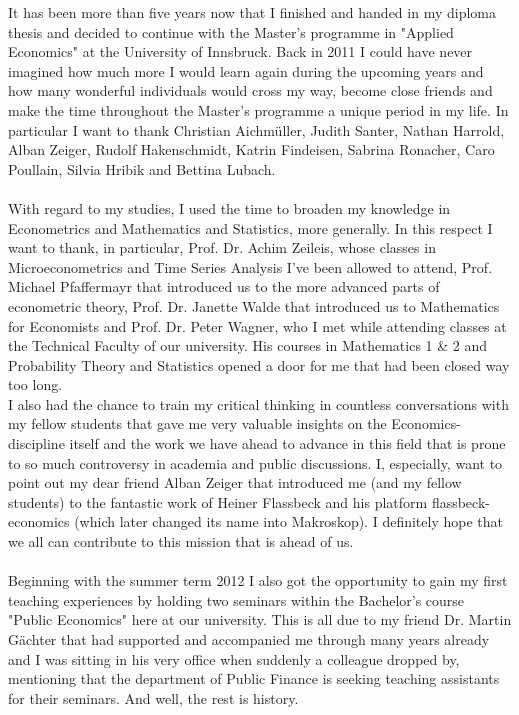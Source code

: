 It has been more than five years now that I finished and handed in my diploma thesis and decided to continue with the Master's programme in "Applied Economics" at the University of Innsbruck. Back in 2011 I could have never imagined how much more I would learn again during the upcoming years and how many wonderful individuals would cross my way, become close friends and make the time throughout the Master's programme a unique period in my life. In particular I want to thank Christian Aichmüller, Judith Santer, Nathan Harrold, Alban Zeiger, Rudolf Hakenschmidt, Katrin Findeisen, Sabrina Ronacher, Caro Poullain, Silvia Hribik and Bettina Lubach. \\ 
\\
With regard to my studies, I used the time to broaden my knowledge in Econometrics and Mathematics and Statistics, more generally. In this respect I want to thank, in particular, Prof. Dr. Achim Zeileis, whose classes in Microeconometrics and Time Series Analysis I've been allowed to attend, Prof. Michael Pfaffermayr that introduced us to the more advanced parts of econometric theory, Prof. Dr. Janette Walde that introduced us to Mathematics for Economists and Prof. Dr. Peter Wagner, who I met while attending classes at the Technical Faculty of our university. His courses in Mathematics 1 \& 2 and Probability Theory and Statistics opened a door for me that had been closed way too long.\\
I also had the chance to train my critical thinking in countless conversations with my fellow students that gave me very valuable insights on the Economics-discipline itself and the work we have ahead to advance in this field that is prone to so much controversy in academia and public discussions. I, especially, want to point out my dear friend Alban Zeiger that introduced me (and my fellow students) to the fantastic work of Heiner Flassbeck and his platform flassbeck-economics (which later changed its name into Makroskop). I definitely hope that we all can contribute to this mission that is ahead of us.\\
\\
Beginning with the summer term 2012 I also got the opportunity to gain my first teaching experiences by holding two seminars within the Bachelor's course "Public Economics" here at our university. This is all due to my friend Dr. Martin Gächter that had supported and accompanied me through many years already and I was sitting in his very office when suddenly a colleague dropped by, mentioning that the department of Public Finance is seeking teaching assistants for their seminars. And well, the rest is history.

